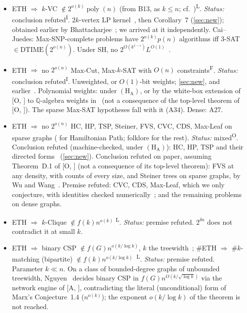 \documentclass[10pt]{amsart}
\theoremstyle{plain}
\theoremstyle{definition}
\theoremstyle{remark}
\numberwithin{equation}{section}
\newcommand{\poly}{\operatorname{poly}}
\newcommand{\A}[1][]{\textup{[A\if\relax\detokenize{#1}\relax\else, #1\fi]}}
\newcommand{\Oa}[1][]{\textup{[O\if\relax\detokenize{#1}\relax\else, #1\fi]}}
\newcommand{\HA}{\ensuremath{(\mathrm{H}_{\mathrm{A}})}}
\newcommand{\Lit}{\textsuperscript{L}}
\newcommand{\Inf}{\textsuperscript{I}}
\newcommand{\Fol}{\textsuperscript{F}}
\newcommand{\Own}{\textsuperscript{O}}
\begin{document}
{\begin{itemize}[leftmargin=2.6em,itemsep=2pt]
\item[B14] ETH $\Rightarrow$ $k$-VC $\notin2^{o(k)}\poly(n)$ (from B13, as $k\le n$; cf.~\cite{CJ03})\Lit. \emph{Status:} conclusion refuted\Inf. $2k$-vertex LP kernel~\cite[\S2.5]{CyganEtAl15}, then Corollary~7 (\cref{sec:new}); obtained earlier by Bhattacharjee~\cite[Thm.~6.13]{Bhattacharjee26}; we arrived at it independently. Cai--Juedes: Max-SNP-complete problems have $2^{o(k)}p(n)$ algorithms iff $3$-SAT $\in\mathrm{DTIME}(2^{o(n)})$. Under SH, no $2^{O(k^{1-\varepsilon})}L^{O(1)}$~\cite[Table~1]{MIT26}.
\item[B15] ETH $\Rightarrow$ no $2^{o(n)}$ Max-Cut, Max-$k$-SAT with $O(n)$ constraints\Fol. \emph{Status:} conclusion refuted\Inf. Unweighted, or $O(1)$-bit weights; \cref{sec:new}, and earlier~\cite[Rem.~6.5, Cor.~6.4]{Bhattacharjee26}. Polynomial weights: under \HA, or by the white-box extension of \Oa{} to $\mathbb{Q}$-algebra weights in~\cite{Bhattacharjee26} (not a consequence of the top-level theorem of \Oa). The sparse Max-SAT hypotheses fall with it (A34). Dense: A27.
\item[B16] ETH $\Rightarrow$ no $2^{o(n)}$ HC, HP, TSP, Steiner, FVS, CVC, CDS, Max-Leaf on sparse graphs (\cite[Thm.~3.3]{LMS11} for Hamiltonian Path; folklore for the rest). \emph{Status:} mixed\Own. Conclusion refuted (machine-checked, under \HA): HC, HP, TSP and their directed forms~\cite{Tulsyan26} (\cref{sec:new}). Conclusion refuted on paper, assuming Theorem~D.1 of \Oa{} (not a consequence of its top-level theorem): FVS at any density, with counts of every size, and Steiner trees on sparse graphs, by Wu and Wang~\cite{WW26f}. Premise refuted: CVC, CDS, Max-Leaf, which we only conjecture, with identities checked numerically~\cite{TulsyanRepo26}; and the remaining problems on dense graphs.
\item[B19] ETH $\Rightarrow$ $k$-Clique $\notin f(k)n^{o(k)}$ \cite[Thm.~5.5]{CHKX06}\Lit. \emph{Status:} premise refuted. $2^{\delta n}$ does not contradict it at small $k$.
\item[B20] ETH $\Rightarrow$ binary CSP $\notin f(G)n^{o(k/\log k)}$, $k$ the treewidth~\cite{Marx10}; $\#$ETH $\Rightarrow$ $\#k$-matching (bipartite) $\notin f(k)n^{o(k/\log k)}$~\cite{CM14}\Lit. \emph{Status:} premise refuted. Parameter $k\ll n$. On a class of bounded-degree graphs of unbounded treewidth, Nguyen~\cite{Nguyen26} decides binary CSP in $f(G)n^{O(k/\sqrt{\log k})}$ via the network engine of \A, contradicting the literal (unconditional) form of Marx's Conjecture~1.4 ($n^{o(k)}$); the exponent $o(k/\log k)$ of the theorem is not reached.

\end{itemize}}
\end{document}
